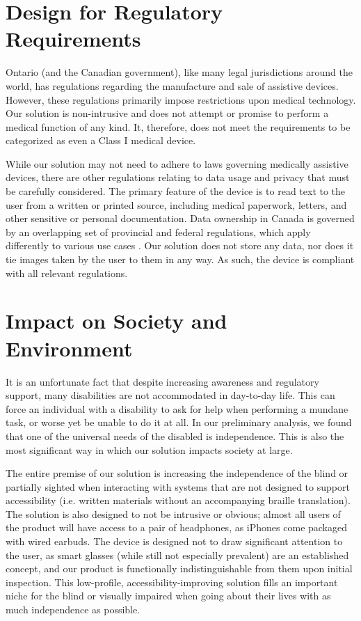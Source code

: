 \documentclass[a4paper,11pt]{article}
\begin{document}
\section{Design for Regulatory Requirements}
Ontario (and the Canadian government), like many legal jurisdictions around the world, has regulations regarding the manufacture and sale of assistive devices. However, these regulations primarily impose restrictions upon medical technology. Our solution is non-intrusive and does not attempt or promise to perform a medical function of any kind. It, therefore, does not meet the requirements to be categorized as even a Class I medical device.

While our solution may not need to adhere to laws governing medically assistive devices, there are other regulations relating to data usage and privacy that must be carefully considered. The primary feature of the device is to read text to the user from a written or printed source, including medical paperwork, letters, and other sensitive or personal documentation. Data ownership in Canada is governed by an overlapping set of provincial and federal regulations, which apply differently to various use cases \cite{pipeda}. Our solution does not store any data, nor does it tie images taken by the user to them in any way. As such, the device is compliant with all relevant regulations.

\section{Impact on Society and Environment}
It is an unfortunate fact that despite increasing awareness and regulatory support, many disabilities are not accommodated in day-to-day life. This can force an individual with a disability to ask for help when performing a mundane task, or worse yet be unable to do it at all. In our preliminary analysis, we found that one of the universal needs of the disabled is independence. This is also the most significant way in which our solution impacts society at large.

The entire premise of our solution is increasing the independence of the blind or partially sighted when interacting with systems that are not designed to support accessibility (i.e. written materials without an accompanying braille translation). The solution is also designed to not be intrusive or obvious; almost all users of the product will have access to a pair of headphones, as iPhones come packaged with wired earbuds. The device is designed not to draw significant attention to the user, as smart glasses (while still not especially prevalent) are an established concept, and our product is functionally indistinguishable from them upon initial inspection. This low-profile, accessibility-improving solution fills an important niche for the blind or visually impaired when going about their lives with as much independence as possible.
\end{document}

